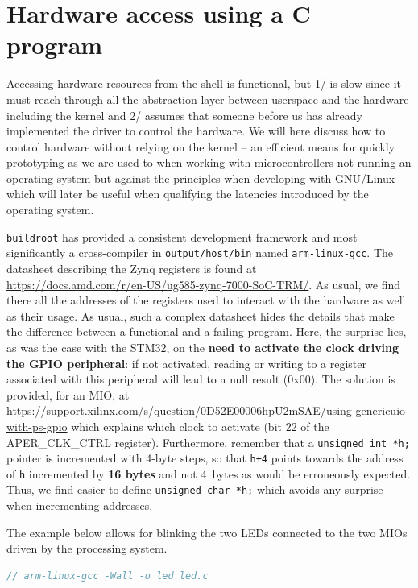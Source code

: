 \documentclass{article}
\begin{document}
{\section{Hardware access using a C program}

Accessing hardware resources from the shell is functional, but 1/ is slow since it
must reach through all the abstraction layer between userspace and the hardware
including the kernel and 2/ assumes that someone before us has already implemented the 
driver to control the hardware. We will here discuss how to control hardware without
relying on the kernel -- an efficient means for quickly prototyping as we are used to
when working with microcontrollers not running an operating system but against the
principles when developing with GNU/Linux -- which will later be useful when qualifying
the latencies introduced by the operating system.

{\tt buildroot} has provided a consistent development framework and most significantly
a cross-compiler in {\tt output/host/bin} named {\tt arm-linux-gcc}. 
The datasheet describing the Zynq registers is found at \\
\url{https://docs.amd.com/r/en-US/ug585-zynq-7000-SoC-TRM/}.
As usual, we find there all the addresses of the registers used to interact with
the hardware as well as their usage. As usual, such a complex datasheet hides the details
that make the difference between a functional and a failing program. Here, the surprise
lies, as was the case with the STM32, on the {\bf need to activate the clock driving the
GPIO peripheral}: if not activated, reading or writing to a register associated with this
peripheral will lead to a null result (0x00). The solution is provided, for an MIO, at
\url{https://support.xilinx.com/s/question/0D52E00006hpU2mSAE/using-genericuio-with-ps-gpio}
which explains
which clock to activate (bit 22 of the APER\_CLK\_CTRL register). Furthermore, remember
that a {\tt unsigned int *h;} pointer is incremented with 4-byte steps, so that
{\tt h+4} points towards the address of {\tt h} incremented by {\bf 16 bytes} and not 4~bytes
as would be erroneously expected. Thus, we find easier to define {\tt unsigned char *h;} which
avoids any surprise when incrementing addresses.

The example below allows for blinking the two LEDs connected to the two MIOs driven by
the processing system.

\begin{lstlisting}[language=C,basicstyle=\footnotesize\ttfamily]
// arm-linux-gcc -Wall -o led led.c


\end{lstlisting}}
\end{document}
